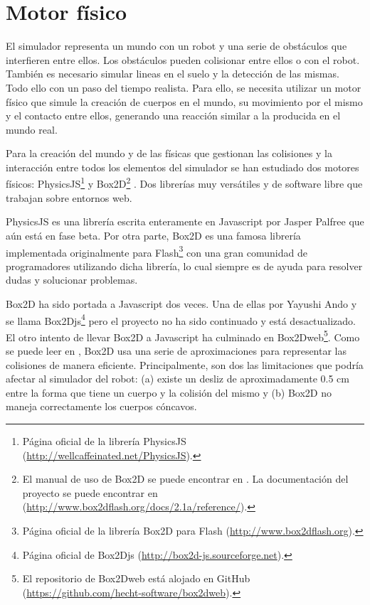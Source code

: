 \section{Motor físico}
\label{sec:motor-fisico}

El simulador representa un mundo con un robot y una serie de obstáculos que interfieren entre ellos. Los obstáculos pueden colisionar entre ellos o con el robot. También es necesario simular lineas en el suelo y la detección de las mismas. Todo ello con un paso del tiempo realista. Para ello, se necesita utilizar un motor físico que simule la creación de cuerpos en el mundo, su movimiento por el mismo y el contacto entre ellos, generando una reacción similar a la producida en el mundo real.

Para la creación del mundo y de las físicas que gestionan las colisiones y la interacción entre todos los elementos del simulador se han estudiado dos motores físicos: PhysicsJS\footnote{Página oficial de la librería PhysicsJS (\url{http://wellcaffeinated.net/PhysicsJS}).} y Box2D\footnote{El manual de uso de Box2D se puede encontrar en \cite{box2d-manual}. La documentación del proyecto se puede encontrar en (\url{http://www.box2dflash.org/docs/2.1a/reference/}).} \cite{box2d}. Dos librerías muy versátiles y de software libre que trabajan sobre entornos web.

PhysicsJS  es una librería escrita enteramente en Javascript por Jasper Palfree que aún está en fase beta. Por otra parte, Box2D es una famosa librería implementada originalmente para Flash\footnote{Página oficial de la librería Box2D para Flash (\url{http://www.box2dflash.org}).} con una gran comunidad de programadores utilizando dicha librería, lo cual siempre es de ayuda para resolver dudas y solucionar problemas. 

Box2D ha sido portada a Javascript dos veces. Una de ellas por Yayushi Ando y se llama Box2Djs\footnote{Página oficial de Box2Djs (\url{http://box2d-js.sourceforge.net}).} pero el proyecto no ha sido continuado y está desactualizado. El otro intento de llevar Box2D a Javascript ha culminado en Box2Dweb\footnote{El repositorio de Box2Dweb está alojado en GitHub (\url{https://github.com/hecht-software/box2dweb}).}. Como se puede leer en \cite[capítulo 13]{box2d-manual}, Box2D usa una serie de aproximaciones para representar las colisiones de manera eficiente. Principalmente, son dos las limitaciones que podría afectar al simulador del robot: (a) existe un desliz de aproximadamente 0.5 cm entre la forma que tiene un cuerpo y la colisión del mismo y (b) Box2D no maneja correctamente los cuerpos cóncavos. 

